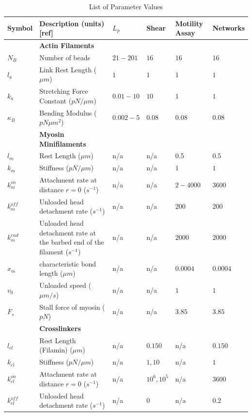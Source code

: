 \documentclass[11pt]{article}
\begin{document}
\begin{table}
  \caption{List of Parameter Values}
  \centering
  \begin{tabular}{|C{1cm}|L{6cm}|C{2cm}|C{2cm}|C{2cm}|C{2cm}|}
    \hline\hline
    Symbol & Description (units) [ref] & $L_p$ & Shear & Motility Assay & Networks\\
    \hline
    &\bf{Actin Filaments}& & & &\\
    \hline
    $N_B$ & Number of beads & $21-201$ & $16$ & $16$ &$16$\\
    $l_a$ & Link Rest Length ($\mu m$)\cite{odijk1983}& $1$ & $1$ &$1$& $1$\\
    $k_a$ & Stretching Force Constant ($pN/\mu m$) & $0.01-10$ & $10$ & $1$ & $1$\\
    $\kappa_B$ & Bending Modulus ($pN\mu m^2$)\cite{ott1993} & $0.002-5 $ & $0.08$ & $0.08$ & $0.08$\\
    \hline
    &\bf{Myosin Minifilaments}& & \\
    \hline
    $l_m$ & Rest Length ($\mu m$)\cite{niederman1975} & n/a & n/a & 0.5 & 0.5\\
    $k_m$ & Stiffness ($pN/\mu m$)& n/a & n/a & $1$ & $1$\\
    $k^{on}_m$ & Attachment rate at distance $r=0$ ($s^{-1}$)& n/a & n/a &$2-4000$ &$3600$\\
    $k^{off}_m$ & Unloaded head detachment rate ($s^{-1}$)& n/a & n/a & $200$ &$200$\\
    $k^{end}_m$ & Unloaded head detachment rate at the barbed end of the filament ($s^{-1}$)& n/a & n/a &$2000$ &$2000$\\
    $x_m$ & characteristic bond length ($\mu m$) \cite{stam2015}& n/a & n/a & $0.0004$& $0.0004$\\
    $v_0$ & Unloaded speed ($\mu m/s$) \cite{kron1986}&  n/a & n/a & $1$ & $1$\\
    $F_s$ & Stall force of myosin ($pN$)\cite{veigel2003}& n/a & n/a & $3.85$ & $3.85$\\
    \hline
    &\bf{Crosslinkers} & & \\
    \hline
    $l_{cl}$& Rest Length (Filamin) ($\mu m$)\cite{ferrer2008} & n/a &$0.150$ &n/a&$0.150$ \\
    $k_\text{cl}$ & Stiffness ($pN/\mu m$)& n/a & $1,10$ & n/a& $1$\\
    $k^{on}_{cl}$ & Attachment rate at distance $r=0$ ($s^{-1}$)& n/a & $10^6,10^5$ &n/a &$3600$\\
    $k^{off}_{cl}$ & Unloaded head detachment rate ($s^{-1}$)& n/a & 0 & n/a&$0.2$\\

\end{tabular}
\end{table}
\end{document}
